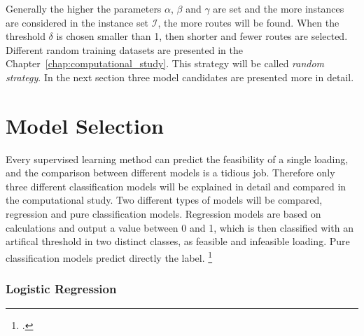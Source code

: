 Generally the higher the parameters $\alpha$, $\beta$ and $\gamma$ are set and the more instances
are considered in the instance set $\mathcal{I}$, the more routes will be found. When the threshold $\delta$
is chosen smaller than 1, then shorter and fewer routes are selected. Different
random training datasets are presented in the Chapter~\ref{chap:computational_study}.
This strategy will be called \textit{random strategy}. In the next section three model candidates
are presented more in detail.

\section{Model Selection}
\label{sec:modelselection}
Every supervised learning method can predict the feasibility of a single loading, and the comparison
between different models is a tidious job. Therefore only three different classification
models will be explained in detail and compared in the computational study.
Two different types of models will be compared, regression and pure classification models. Regression
models are based on calculations and output a value between 0 and 1, which is then classified with
an artifical threshold in two distinct classes, as feasible and infeasible loading. Pure classification
models predict directly the label. \footcite[cf.][p.5]{nasteski_overview_2017}

\subsubsection{Logistic Regression}

